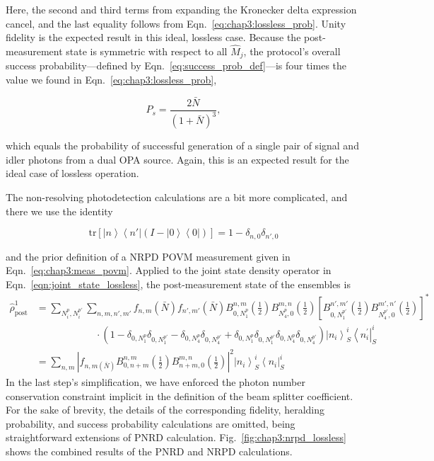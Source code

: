 \documentclass[aps,twocolumn,secnumarabic,amsmath,amssymb,pra,groupedaddress,
showpacs, showkeys,draft]{revtex4-1}
\newcommand{\bra}[1]{\left\langle #1 \right|}
\newcommand{\ket}[1]{\left|#1\right\rangle}
\newcommand{\pna}[1]{\left(#1\right)}
\newcommand{\pnb}[1]{\left[#1\right]}
\newcommand{\eqn}[1]{
\begin{equation}
	#1
\end{equation}
}
\newcommand{\abs}[1]{\left|#1\right|}
\begin{document}
Here, the second and third terms from expanding the Kronecker delta expression
cancel, and the last equality follows from
Eqn.~\ref{eq:chap3:lossless_prob}. Unity fidelity is the expected result in
this ideal, lossless case. Because the post-measurement state is symmetric with
respect to all $\hat{M}_j$, the protocol's overall success
probability---defined by Eqn.~\ref{eq:success_prob_def}---is four times the
value we found in Eqn.~\ref{eq:chap3:lossless_prob},
\eqn{
P_{s}= \frac{2\bar{N}}{\pna{1+\bar{N}}^3},
}
which equals the probability of successful generation of a single pair of
signal and idler photons from a dual OPA source. Again, this is an expected
result for the ideal case of lossless operation. 

The non-resolving photodetection calculations are a bit more complicated, and
there we use the identity
\eqn{
\textrm{tr}\pnb{\ket{n}\bra{n'}\pna{I-\ket{0}\bra{0}}}=1-\delta_{n,0}\delta_{n',0}
}
and the prior definition of a NRPD POVM measurement given in
Eqn.~\ref{eq:chap3:meas_povm}. Applied to the joint state density operator in
Eqn.~\ref{eqn:joint_state_lossless}, the post-measurement state of the
ensembles is
\begin{align}
\hat{\rho}_{\textrm{post}}^{1}& =\sum_{N_i^p, N_i^{p\prime}}\sum_{n,m,n',m'} f_{n,m}\pna{\bar{N}}f_{n',m'}\pna{\bar{N}} B_{0,N_1^p}^{n,m}\pna{\frac{1}{2}}  
B_{N_4^p,0}^{m,n}\pna{\frac{1}{2}}\pnb{B_{0,N_1^{p\prime}}^{n',m'}\pna{\frac{1}{2}}  
B_{N_4^{p\prime},0}^{m',n'}\pna{\frac{1}{2}}}^* \nonumber \\
& \qquad\qquad\qquad\cdot  \pna{1-\delta_{0,N_1^{p}}\delta_{0,N_1^{p\prime}} - \delta_{0,N_4^{p}}\delta_{0,N_4^{p\prime}} + \delta_{0,N_1^{p}}\delta_{0,N_1^{p\prime}} \delta_{0,N_4^{p}}\delta_{0,N_4^{p\prime}}}\ket{n_i}^i_S\bra{n_i^{\prime}}^i_S \nonumber \\
& = \sum_{n,m} \abs{f_{n,m\pna{\bar{N}}} B_{0,n+m}^{n,m}\pna{\frac{1}{2}} B_{n+m,0}^{m,n}\pna{\frac{1}{2} }}^2 \ket{n_i}^i_S\bra{n_i}^i_S
\end{align}
In the last step's simplification, we have enforced the photon number
conservation constraint implicit in the definition of the beam splitter
coefficient. For the sake of brevity, the details of the corresponding
fidelity, heralding probability, and success probability calculations are
omitted, being straightforward extensions of PNRD
calculation. Fig.~\ref{fig:chap3:nrpd_lossless} shows the combined results of
the PNRD and NRPD calculations.
\end{document}
